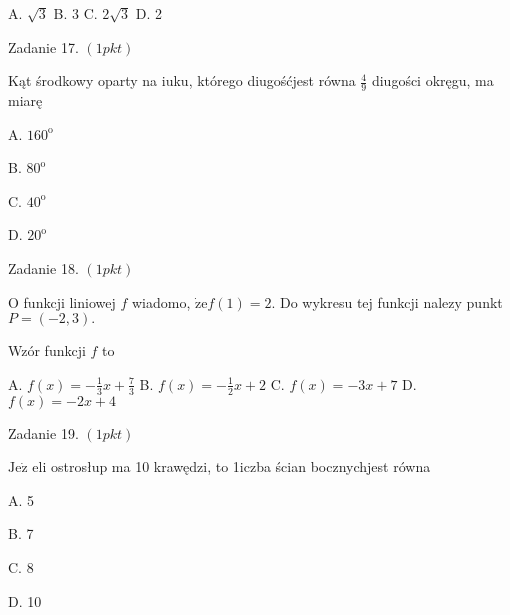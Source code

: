 \documentclass[a4paper,12pt]{article}
\begin{document}
A. $\sqrt{3}$ B. 3 C. $2\sqrt{3}$ D. 2

Zadanie 17. $(1pkt)$

Kąt środkowy oparty na iuku, którego diugośćjest równa $\displaystyle \frac{4}{9}$ diugości okręgu, ma miarę

A. $160^{\mathrm{o}}$

B. $80^{\mathrm{o}}$

C. $40^{\mathrm{o}}$

D. $20^{\mathrm{o}}$

Zadanie 18. $(1pkt)$

$\mathrm{O}$ funkcji liniowej $f$ wiadomo, $\dot{\mathrm{z}}\mathrm{e}f(1)=2$. Do wykresu tej funkcji nalez$\mathrm{y}$ punkt $P=(-2,3).$

Wzór funkcji $f$ to

A. $f(x)=-\displaystyle \frac{1}{3}x+\frac{7}{3}$ B. $f(x)=-\displaystyle \frac{1}{2}x+2$ C. $f(x)=-3x+7$ D. $f(x)=-2x+4$

Zadanie 19. $(1pkt)$

$\mathrm{J}\mathrm{e}\dot{\mathrm{z}}$ eli ostrosłup ma 10 krawędzi, to 1iczba ścian bocznychjest równa

A. 5

B. 7

C. 8

D. 10
\end{document}
